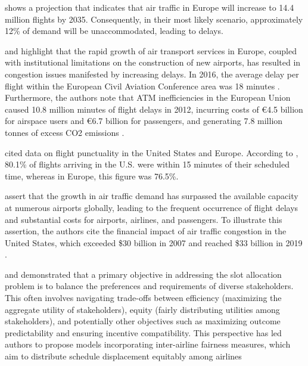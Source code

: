  shows a projection that indicates that air traffic in Europe will increase to 14.4 million flights by 2035. Consequently, in their most likely scenario, approximately 12\% of demand will be unaccommodated, leading to delays.

 and  highlight that the rapid growth of air transport services in Europe, coupled with institutional limitations on the construction of new airports, has resulted in congestion issues manifested by increasing delays. In 2016, the average delay per flight within the European Civil Aviation Conference area was 18 minutes \cite{Eurocontrol_AnnualReport2016}. Furthermore, the authors note that \acrfull{ATM} inefficiencies in the European Union caused 10.8 million minutes of flight delays in 2012, incurring costs of €4.5 billion for airspace users and €6.7 billion for passengers, and generating 7.8 million tonnes of excess CO2 emissions \cite{IATA_SESFactsheet2014a}.

 cited data on flight punctuality in the United States and Europe. According to , 80.1\% of flights arriving in the U.S. were within 15 minutes of their scheduled time, whereas in Europe, this figure was 76.5\%.

 assert that the growth in air traffic demand has surpassed the available capacity at numerous airports globally, leading to the frequent occurrence of flight delays and substantial costs for airports, airlines, and passengers. To illustrate this assertion, the authors cite the financial impact of air traffic congestion in the United States, which exceeded \$30 billion in 2007 \cite{gillen2016airport, jacquillat_interairline_2018, jacquillat_roadmap_2018, ribeiro_large-scale_2019} and reached \$33 billion in 2019 \cite{dixit_algorithmic_2023}.

 and  demonstrated that a primary objective in addressing the slot allocation problem is to balance the preferences and requirements of diverse stakeholders. This often involves navigating trade-offs between efficiency (maximizing the aggregate utility of stakeholders), equity (fairly distributing utilities among stakeholders), and potentially other objectives such as maximizing outcome predictability and ensuring incentive compatibility. This perspective has led authors to propose models incorporating inter-airline fairness measures, which aim to distribute schedule displacement equitably among airlines \cite{fairbrother2018development, jacquillat_roadmap_2018,  zografos_bi-objective_2019, jiang_decision_2021}

